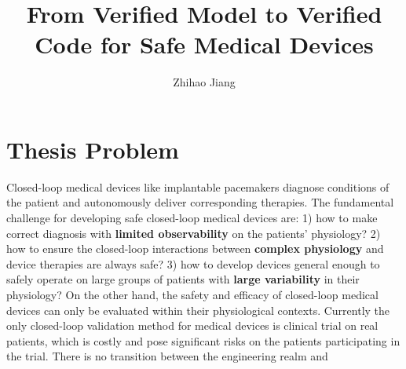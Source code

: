 \documentclass[a4paper]{article}
\title{From Verified Model to Verified Code for Safe Medical Devices}
\author{Zhihao Jiang}
\begin{document}
\maketitle


\section*{Thesis Problem}
Closed-loop medical devices like implantable pacemakers diagnose conditions of the patient and autonomously deliver corresponding therapies.
The fundamental challenge for developing safe closed-loop medical devices are: 
1) how to make correct diagnosis with \textbf{limited observability} on the patients' physiology? 
2) how to ensure the closed-loop interactions between \textbf{complex physiology} and device therapies are always safe?
3) how to develop devices general enough to safely operate on large groups of patients with \textbf{large variability} in their physiology?
On the other hand, the safety and efficacy of closed-loop medical devices can only be evaluated within their physiological contexts. 
Currently the only closed-loop validation method for medical devices is clinical trial on real patients, which is costly and pose significant risks on the patients participating in the trial. 
There is no transition between the engineering realm and 
\end{document}
